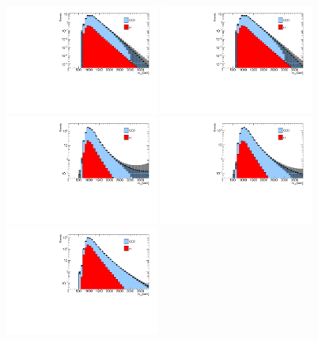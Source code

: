 \begin{figure}[htbp!]
\begin{center}
\includegraphics[width=0.45\textwidth,angle=-90]{figures/boosted/Smooth/FourTag_pole_smoothed.pdf}
\includegraphics[width=0.45\textwidth,angle=-90]{figures/boosted/Smooth/FourTag_pole_smoothed.pdf}\\
\includegraphics[width=0.45\textwidth,angle=-90]{figures/boosted/Smooth/ThreeTag_l_smoothed.pdf}
\includegraphics[width=0.45\textwidth,angle=-90]{figures/boosted/Smooth/ThreeTag_pole_smoothed.pdf}\\
\includegraphics[width=0.45\textwidth,angle=-90]{figures/boosted/Smooth/TwoTag_split_l_smoothed.pdf}

\end{center}
\end{figure}
